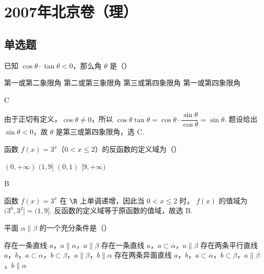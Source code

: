 
\chapter{2007年北京卷（理）}
\section{单选题}
\begin{problem}
已知 \(\cos \theta \cdot \tan \theta < 0\)，那么角 \(\theta\) 是（\quad）

\choices
    {第一或第二象限角}
    {第二或第三象限角}
    {第三或第四象限角}
    {第一或第四象限角}
\end{problem}

\begin{answer}
C
\end{answer}

\begin{solution}
由于正切有定义，\(\cos\theta\ne0\)，所以
\(\cos\theta\tan\theta=\cos\theta\cdot\dfrac{\sin\theta}{\cos\theta}=\sin\theta\).
题设给出 \(\sin\theta<0\)，故 \(\theta\) 是第三或第四象限角，选 C.
\end{solution}

\begin{problem}
函数 \(f(x)=3^x\)（\(0 < x \leqslant 2\)）的反函数的定义域为（\quad）

\choices
    {\((0, +\infty)\)}
    {\((1, 9]\)}
    {\((0,1)\)}
    {\([9, +\infty)\)}
\end{problem}

\begin{answer}
B
\end{answer}

\begin{solution}
函数 \(f(x)=3^x\) 在 \(\R\) 上单调递增，因此当 \(0<x\leqslant2\) 时，
\(f(x)\) 的值域为 \((3^0,3^2]=(1,9]\). 反函数的定义域等于原函数的值域，故选 B.
\end{solution}

\begin{problem}
平面 \(\alpha \parallel \beta\) 的一个充分条件是（\quad）

\choices
    {存在一条直线 \(a\)，\(a \parallel \alpha\)，\(a \parallel \beta\)}
    {存在一条直线 \(a\)，\(a \subset \alpha\)，\(a \parallel \beta\)}
    {存在两条平行直线 \(a\)，\(b\)，\(a \subset \alpha\)，\(b \subset \beta\)，\(a \parallel \beta\)，\(b \parallel \alpha\)}
    {存在两条异面直线 \(a\)，\(b\)，\(a \subset \alpha\)，\(b \subset \beta\)，\(a \parallel \beta\)，\(b \parallel \alpha\)}
\end{problem}

